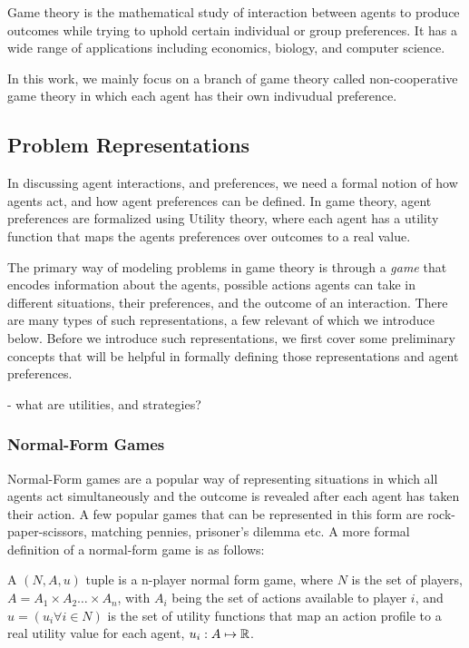 Game theory is the mathematical study of interaction between agents to produce outcomes while
trying to uphold certain individual or group preferences.
It has a wide range of applications including economics, biology, and computer science.

In this work, we mainly focus on a branch of game theory called non-cooperative game theory in
which each agent has their own indivudual preference.

\subsection{Problem Representations}

In discussing agent interactions, and preferences, we need a formal notion of how agents act, and
how agent preferences can be defined.
In game theory, agent preferences are formalized using Utility theory, where each agent has a
utility function that maps the agents preferences over outcomes to a real value.

The primary way of modeling problems in game theory is through a \textit{game} that encodes
information about the agents, possible actions agents can take in different situations, their
preferences, and the outcome of an interaction.
There are many types of such representations, a few relevant of which we introduce below.
Before we introduce such representations, we first cover some preliminary concepts that will be
helpful in formally defining those representations and agent preferences.

- what are utilities, and strategies?

\subsubsection*{Normal-Form Games}

Normal-Form games are a popular way of representing situations in which all agents act
simultaneously and the outcome is revealed after each agent has taken their action.
A few popular games that can be represented in this form are rock-paper-scissors, matching pennies,
prisoner's dilemma etc. A more formal definition of a normal-form game is as follows:

\begin{definition}

	A $(N, A, u)$ tuple
	is a n-player normal form game, where $N$ is the set of players, $A = A_1 \times A_2 \ldots \times
		A_n$, with $A_i$ being the set of actions available to player $i$, and $u = (u_i \forall i \in N)$
	is the set of utility functions that map an action profile to a real utility value for each agent,
	$u_i: A \mapsto \mathbb{R}$.

\end{definition}


